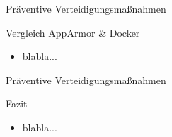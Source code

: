 \begin{frame}{Präventive Verteidigungsmaßnahmen}
        \begin{block}{Vergleich AppArmor \& Docker}
                \begin{itemize}
                        \item blabla... 
                \end{itemize}
        \end{block}
\end{frame}

\begin{frame}{Präventive Verteidigungsmaßnahmen}
        \begin{block}{Fazit}
                \begin{itemize}
                        \item blabla... 
                \end{itemize}
        \end{block}
\end{frame}

